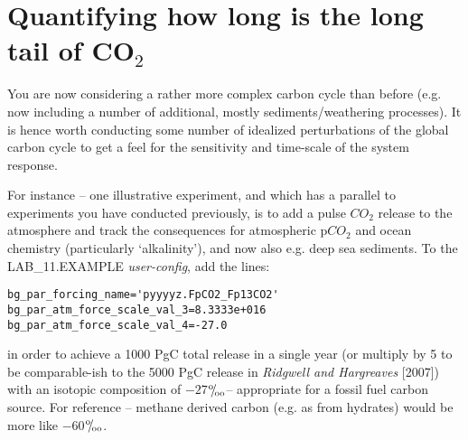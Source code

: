 \documentclass[11pt,fleqn]{book} %
\def\permille{\ensuremath{{}^\text{o}\mkern-5mu/\mkern-3mu_\text{oo}}}
\begin{document}

\newpage


\section{Quantifying how long is the long tail of CO$_{2}$}

You are now considering a rather more complex carbon cycle than before (e.g. now including a number of additional, mostly sediments/weathering processes). It is hence worth conducting some number of idealized perturbations of the global carbon cycle to get a feel for the sensitivity and time-scale of the system response.

For instance – one illustrative experiment, and which has a parallel to experiments you have conducted previously, is to add a pulse \(CO_{2}\) release to the atmosphere and track the consequences for atmospheric p\(CO_{2}\) and ocean chemistry (particularly ‘alkalinity’), and now also e.g. deep sea sediments. To the \textsf{\footnotesize LAB\_11.EXAMPLE} \textit{user-config}, add the lines:
\vspace{-1mm}\small\begin{verbatim}
bg_par_forcing_name='pyyyyz.FpCO2_Fp13CO2'
bg_par_atm_force_scale_val_3=8.3333e+016
bg_par_atm_force_scale_val_4=-27.0
\end{verbatim}\normalsize\vspace{-1mm}
in order to achieve a 1000 PgC total release in a single year (or multiply by 5 to be comparable-ish to the 5000 PgC release in \textit{Ridgwell and Hargreaves} [2007]) with an isotopic composition of \(-27\)\permille -- appropriate for a fossil fuel carbon source. For reference -- methane derived carbon (e.g. as from hydrates) would be more like  \(-60\)\permille.
\end{document}
